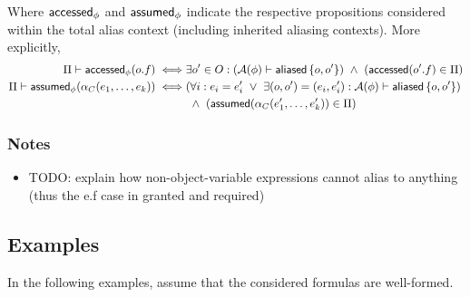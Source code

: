 \noindent
Where $\textsf{accessed}_\phi$ and $\textsf{assumed}_\phi$ indicate the respective propositions considered within the total alias context (including inherited aliasing contexts). More explicitly,
\begin{align*}
\Pi \entails \accessed_\phi(o.f) \iff &
  \exists o\p \in O :
  (\A(\phi) \entails \aliased\set{o, o\p}) \ \land \
  (\accessed(o\p.f) \in \Pi)
\\
\Pi \entails \assumed_\phi(\alpha_C(e_1, \dots, e_k)) \iff &
  (\forall i :
    e_i = e\p_i \ \lor \ %
    \exists (o, o\p) = (e_i, e\p_i) : \A(\phi) \entails \aliased\set{o, o\p}
  )
  \\ & \ \land \
  (\assumed(\alpha_C(e\p_1, \dots, e\p_k)) \in \Pi)
\end{align*}

\subsubsection{Notes}

\begin{itemize}
  \item TODO: explain how non-object-variable expressions cannot alias to anything (thus the e.f case in granted and required)
\end{itemize}

\subsection{Examples}

In the following examples, assume that the considered formulas are well-formed.

